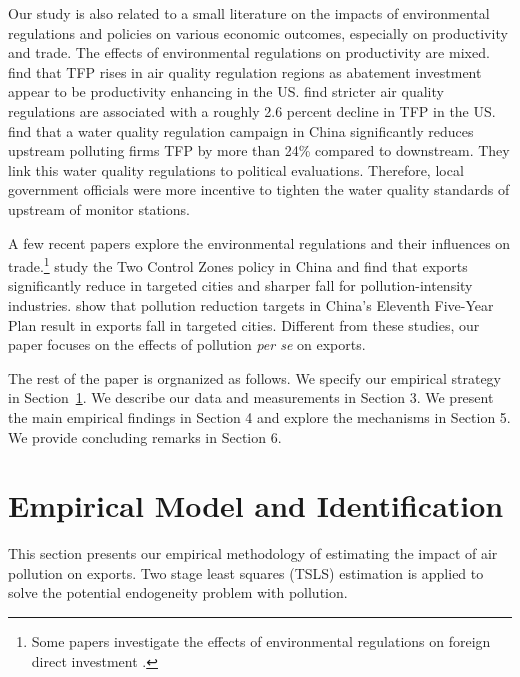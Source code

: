 \documentclass[12pt]{article}
\begin{document}
Our study is also related to a small literature on the impacts of
environmental regulations and policies on various economic outcomes,
especially on productivity and trade. The effects of environmental
regulations on productivity are mixed. \cite{berman2001environmental} find that TFP
rises in air quality regulation regions as abatement investment appear to be
productivity enhancing in the US. \cite{greenstone2012effects} find stricter air
quality regulations are associated with a roughly 2.6 percent decline in TFP
in the US. \cite{he2020watering} find that a water quality regulation campaign in
China significantly reduces upstream polluting firms TFP by more than 24\%
compared to downstream. They link this water quality regulations to
political evaluations. Therefore, local government officials were more incentive to
tighten the water quality standards of upstream of monitor stations.

A few recent papers explore the environmental regulations and their
influences on trade.\footnote{Some papers investigate the effects of environmental regulations on foreign
direct investment \citep{dean2009foreign,cai2016does}.} \cite{hering2014environmental} study the Two Control Zones policy in China and find that exports significantly reduce in targeted cities and sharper fall for
pollution-intensity industries. \cite{shi2018environmental} show that pollution
reduction targets in China's Eleventh Five-Year Plan result in exports fall
in targeted cities. Different from these studies, our paper focuses on the
effects of pollution \textit{per se} on exports.

The rest of the paper is orgnanized as follows. We specify our empirical
strategy in Section~\ref{sec:empirical_strategy}. We describe our data and measurements in Section 3.
We present the main empirical findings in Section 4 and explore the
mechanisms in Section 5. We provide concluding remarks in Section 6.

\section{Empirical Model and Identification} \label{sec:empirical_strategy}
This section presents our empirical methodology of estimating the impact of air pollution on exports. Two stage least squares (TSLS) estimation is applied to solve the potential endogeneity problem with pollution.  
\end{document}
